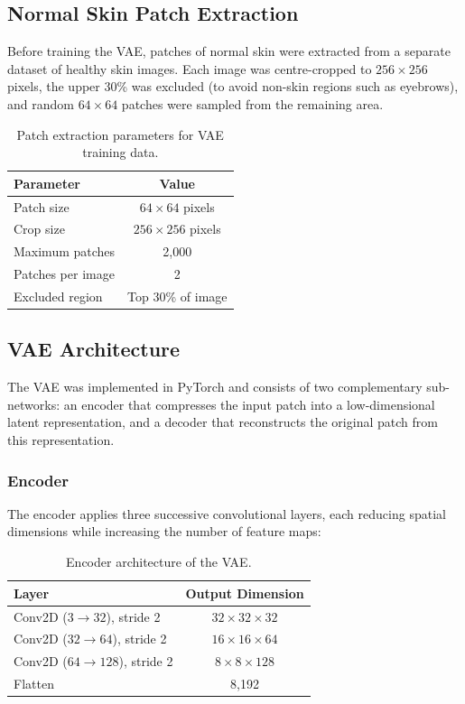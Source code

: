 \subsection{Normal Skin Patch Extraction}

Before training the VAE, patches of normal skin were extracted from a separate dataset of healthy skin images. Each image was centre-cropped to $256 \times 256$ pixels, the upper 30\% was excluded (to avoid non-skin regions such as eyebrows), and random $64 \times 64$ patches were sampled from the remaining area.

\begin{table}[H]
\centering
\caption{Patch extraction parameters for VAE training data.}
\label{tab:patch_params}
\begin{tabular}{|l|c|}
\hline
\textbf{Parameter} & \textbf{Value} \\ \hline
Patch size & $64 \times 64$ pixels \\ \hline
Crop size & $256 \times 256$ pixels \\ \hline
Maximum patches & 2{,}000 \\ \hline
Patches per image & 2 \\ \hline
Excluded region & Top 30\% of image \\ \hline
\end{tabular}
\end{table}

\subsection{VAE Architecture}

The VAE was implemented in PyTorch and consists of two complementary sub-networks: an encoder that compresses the input patch into a low-dimensional latent representation, and a decoder that reconstructs the original patch from this representation.

\subsubsection{Encoder}

The encoder applies three successive convolutional layers, each reducing spatial dimensions while increasing the number of feature maps:

\begin{table}[H]
\centering
\caption{Encoder architecture of the VAE.}
\label{tab:encoder}
\begin{tabular}{|l|c|}
\hline
\textbf{Layer} & \textbf{Output Dimension} \\ \hline
Conv2D ($3 \rightarrow 32$), stride 2 & $32 \times 32 \times 32$ \\ \hline
Conv2D ($32 \rightarrow 64$), stride 2 & $16 \times 16 \times 64$ \\ \hline
Conv2D ($64 \rightarrow 128$), stride 2 & $8 \times 8 \times 128$ \\ \hline
Flatten & 8{,}192 \\ \hline
\end{tabular}
\end{table}

